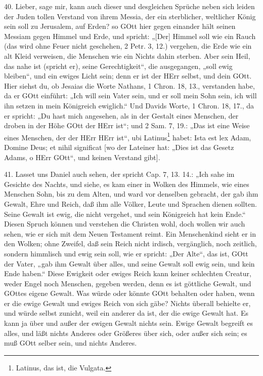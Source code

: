 40. Lieber, sage mir, kann auch dieser und desgleichen Sprüche neben sich leiden der Juden tollen Verstand von ihrem Messia, der ein sterblicher, weltlicher König sein soll zu Jerusalem, auf Erden? so GOtt hier gegen einander hält seinen Messiam gegen Himmel und Erde, und spricht: „[Der] Himmel soll wie ein Rauch (das wird ohne Feuer nicht geschehen, 2 Petr. 3, 12.) vergehen, die Erde wie ein alt Kleid verweisen, die Menschen wie ein Nichts dahin sterben. Aber sein Heil, das nahe ist (spricht er), seine Gerechtigkeit“, die ausgegangen, „soll ewig bleiben“, und ein ewiges Licht sein; denn er ist der HErr selbst, und dein GOtt. Hier siehst du, ob Jesaias die Worte Nathans, 1 Chron. 18, 13., verstanden habe, da er GOtt einführt: „Ich will sein Vater sein, und er soll mein Sohn sein, ich will ihn setzen in mein Königreich ewiglich.“ Und Davids Worte, 1 Chron. 18, 17., da er spricht: „Du hast mich angesehen, als in der Gestalt eines Menschen, der droben in der Höhe GOtt der HErr ist“; und 2 Sam. 7, 19.: „Das ist eine Weise eines Menschen, der der HErr HErr ist“, ubi Latinus\footnote{Latinus, das ist, die Vulgata.} habet: Ista est lex Adam, Domine Deus; et nihil significat [wo der Lateiner hat: „Dies ist das Gesetz Adams, o HErr GOtt“, und keinen Verstand gibt].

41. Lasset uns Daniel auch sehen, der spricht Cap. 7, 13. 14.: „Ich sahe im Gesichte des Nachts, und siehe, es kam einer in Wolken des Himmels, wie eines Menschen Sohn, bis zu dem Alten, und ward vor denselben gebracht, der gab ihm Gewalt, Ehre und Reich, daß ihm alle Völker, Leute und Sprachen dienen sollten. Seine Gewalt ist ewig, die nicht vergehet, und sein Königreich hat kein Ende.“ Diesen Spruch können und verstehen die Christen wohl, doch wollen wir auch sehen, wie er sich mit dem Neuen Testament reimt. Ein Menschenkind sieht er in den Wolken; ohne Zweifel, daß sein Reich nicht irdisch, vergänglich, noch zeitlich, sondern himmlisch und ewig sein soll, wie er spricht: „Der Alte“, das ist, GOtt der Vater, „gab ihm Gewalt über alles, und seine Gewalt soll ewig sein, und kein Ende haben.“ Diese Ewigkeit oder ewiges Reich kann keiner schlechten Creatur, weder Engel noch Menschen, gegeben werden, denn es ist göttliche Gewalt, und GOttes eigene Gewalt. Was würde oder könnte GOtt behalten oder haben, wenn er die ewige Gewalt und ewiges Reich von sich gäbe? Nichts überall behielte er, und würde selbst zunicht, weil ein anderer da ist, der die ewige Gewalt hat. Es kann ja über und außer der ewigen Gewalt nichts sein. Ewige Gewalt begreift es alles, und läßt nichts Anderes oder Größeres über sich, oder außer sich sein; es muß GOtt selber sein, und nichts Anderes.

